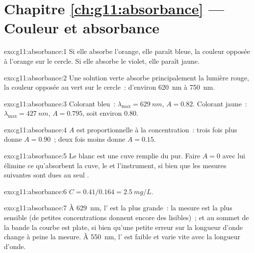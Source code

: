 \section*{Chapitre \ref{ch:g11:absorbance} --- Couleur et absorbance}

\begin{solution}{exo:g11:absorbance:1}
Si elle absorbe l'orange, elle paraît bleue, la couleur opposée à
l'orange sur le cercle. Si elle absorbe le violet, elle paraît jaune.
\end{solution}

\begin{solution}{exo:g11:absorbance:2}
Une solution verte absorbe principalement la lumière rouge, la couleur
opposée au vert sur le cercle~: d'environ \qty{620}{nm} à
\qty{750}{nm}.
\end{solution}

\begin{solution}{exo:g11:absorbance:3}
Colorant bleu~: $\lambda_{\max} = \qty{629}{nm}$, $A = 0.82$. Colorant
jaune~: $\lambda_{\max} = \qty{427}{nm}$, $A = 0.795$, soit environ 0.80.
\end{solution}

\begin{solution}{exo:g11:absorbance:4}
$A$ est proportionnelle à la concentration~: trois fois plus donne
$A = 0.90$~; deux fois moins donne $A = 0.15$.
\end{solution}

\begin{solution}{exo:g11:absorbance:5}
Le blanc est une cuve remplie du  pur. Faire $A = 0$ avec lui
élimine ce qu'absorbent la cuve, le  et l'instrument, si bien que
les mesures suivantes sont dues au seul .
\end{solution}

\begin{solution}{exo:g11:absorbance:6}
$C = 0.41 / 0.164 = \qty{2.5}{mg/L}$.
\end{solution}

\begin{solution}{exo:g11:absorbance:7}
À \qty{629}{nm}, l' est la plus grande~: la mesure est la plus
sensible (de petites concentrations donnent encore des 
lisibles)~; et au sommet de la bande la courbe est plate, si bien qu'une
petite erreur sur la longueur d'onde change à peine la mesure. À
\qty{550}{nm}, l' est faible et varie vite avec la longueur
d'onde.
\end{solution}

